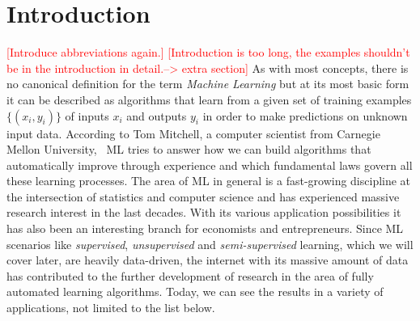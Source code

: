 \documentclass[conference]{IEEEtran}
\newcommand\notes[1]{\textcolor{red}{#1}}
\begin{document}
\section{Introduction}\label{sec:intro}
\notes{[Introduce abbreviations again.]}
\notes{[Introduction is too long, the examples shouldn't be in the introduction in detail.--> extra section]}
As with most concepts, there is no canonical 
definition for the term \textit{Machine Learning} but at its most basic form it 
can be described as algorithms that learn from a given set of training examples 
$\{(x_i, y_i)\}$ of inputs $x_i$ and outputs $y_i$ in order to 
make predictions on unknown input data. According to Tom 
Mitchell, a computer scientist from Carnegie Mellon University,  ML tries 
to answer how we can build algorithms that automatically improve through 
experience and which fundamental laws govern all these learning processes\cite{ML:mitchell}.
The area of ML in general is a fast-growing discipline at the intersection of statistics 
and computer science and has experienced massive research interest in the last decades.
With its various application possibilities it has also been an interesting branch for 
economists and entrepreneurs.
Since ML scenarios like \textit{supervised}, \textit{unsupervised} and 
\textit{semi-supervised} learning, which we will cover later, are heavily data-driven, 
the internet with its massive amount of data has contributed to the further development 
of research in the area of fully automated learning algorithms. Today, we can see the 
results in a variety of applications\cite{FoundationsOfML:mohri}\cite{DisciplineOfML:mitchell}, 
not limited to the list below.
\end{document}
